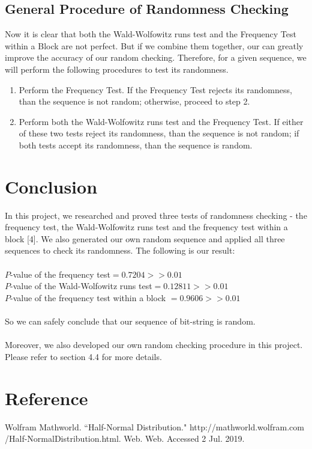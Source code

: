 \documentclass[a4paper,12pt]{article}
\begin{document}
\subsection{General Procedure of Randomness Checking}
\noindent Now it is clear that both the Wald-Wolfowitz runs test and the Frequency Test within a Block are not perfect. But if we combine them together, our can greatly improve the accuracy of our random checking. Therefore, for a given sequence, we will perform the following procedures to test its randomness.
\begin{enumerate}
\item Perform the Frequency Test. If the Frequency Test rejects its randomness, than the sequence is not random; otherwise, proceed to step 2.
\item Perform both the Wald-Wolfowitz runs test and the Frequency Test. If either of these two tests reject its randomness, than the sequence is not random; if both tests accept its randomness, than the sequence is random.
\end{enumerate}

\section{Conclusion}
\noindent
In this project, we researched and proved three tests of randomness checking - the
frequency test, the Wald-Wolfowitz runs test  and the frequency
test within a block [4]. We also generated our own random sequence and applied all three sequences to check its randomness. The following is our result:\\\\
$P$-value of the frequency test$= 0.7204 >> 0.01$\\
$P$-value of the Wald-Wolfowitz runs test$=0.12811 >> 0.01$\\
$P$-value of the frequency
test within a block $=0.9606 >> 0.01$\\
\\So we can safely conclude that our  sequence  of bit-string is random. \\\\
Moreover, we also developed our own random checking procedure in this project. Please refer to section 4.4 for more details.
\newpage
\section{Reference}
\noindent [1] Wolfram Mathworld. ``Half-Normal Distribution." http://mathworld.wolfram.com\\/Half-NormalDistribution.html. Web. Web. Accessed 2 Jul. 2019.
\end{document}
